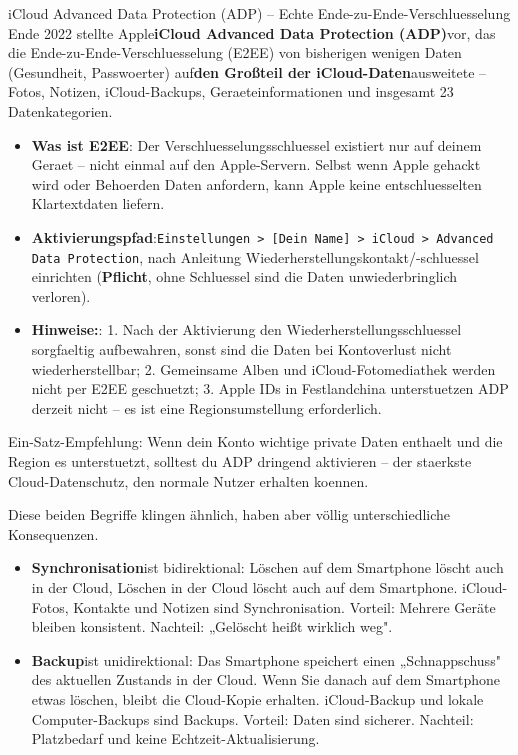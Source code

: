 \begin{tcbwarn}{iCloud Advanced Data Protection (ADP) – Echte Ende-zu-Ende-Verschluesselung}
Ende 2022 stellte Apple\textbf{iCloud Advanced Data Protection (ADP)}vor, das die Ende-zu-Ende-Verschluesselung (E2EE) von bisherigen wenigen Daten (Gesundheit, Passwoerter) auf\textbf{den Großteil der iCloud-Daten}ausweitete – Fotos, Notizen, iCloud-Backups, Geraeteinformationen und insgesamt 23 Datenkategorien.

\begin{itemize}
  \item \textbf{Was ist E2EE}: Der Verschluesselungsschluessel existiert nur auf deinem Geraet – nicht einmal auf den Apple-Servern. Selbst wenn Apple gehackt wird oder Behoerden Daten anfordern, kann Apple keine entschluesselten Klartextdaten liefern.
  \item \textbf{Aktivierungspfad}:\texttt{Einstellungen > [Dein Name] > iCloud > Advanced Data Protection}, nach Anleitung Wiederherstellungskontakt/-schluessel einrichten (\textbf{Pflicht}, ohne Schluessel sind die Daten unwiederbringlich verloren).
  \item \textbf{Hinweise:}: 1. Nach der Aktivierung den Wiederherstellungsschluessel sorgfaeltig aufbewahren, sonst sind die Daten bei Kontoverlust nicht wiederherstellbar; 2. Gemeinsame Alben und iCloud-Fotomediathek werden nicht per E2EE geschuetzt; 3. Apple IDs in Festlandchina unterstuetzen ADP derzeit nicht – es ist eine Regionsumstellung erforderlich.
\end{itemize}

Ein-Satz-Empfehlung: Wenn dein Konto wichtige private Daten enthaelt und die Region es unterstuetzt, solltest du ADP dringend aktivieren – der staerkste Cloud-Datenschutz, den normale Nutzer erhalten koennen.

\end{tcbwarn}


Diese beiden Begriffe klingen ähnlich, haben aber völlig unterschiedliche Konsequenzen.

\begin{itemize}
  \item \textbf{Synchronisation}ist bidirektional: Löschen auf dem Smartphone löscht auch in der Cloud, Löschen in der Cloud löscht auch auf dem Smartphone. iCloud-Fotos, Kontakte und Notizen sind Synchronisation. Vorteil: Mehrere Geräte bleiben konsistent. Nachteil: „Gelöscht heißt wirklich weg".
  \item \textbf{Backup}ist unidirektional: Das Smartphone speichert einen „Schnappschuss" des aktuellen Zustands in der Cloud. Wenn Sie danach auf dem Smartphone etwas löschen, bleibt die Cloud-Kopie erhalten. iCloud-Backup und lokale Computer-Backups sind Backups. Vorteil: Daten sind sicherer. Nachteil: Platzbedarf und keine Echtzeit-Aktualisierung.
\end{itemize}

